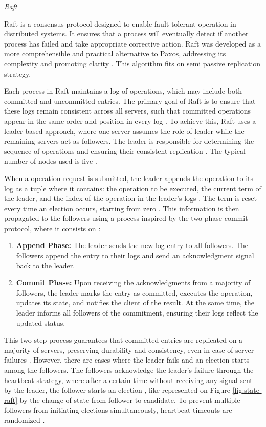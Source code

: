 \textit{\underline{Raft}}

Raft is a consensus protocol designed to enable fault-tolerant operation in distributed systems. It ensures that a process will eventually detect if another process has failed and take appropriate corrective action. Raft was developed as a more comprehensible and practical alternative to Paxos, addressing its complexity and promoting clarity \cite{raft-diego,Tanenbaum2023}. This algorithm fits on semi passive replication strategy.

Each process in Raft maintains a log of operations, which may include both committed and uncommitted entries. The primary goal of Raft is to ensure that these logs remain consistent across all servers, such that committed operations appear in the same order and position in every log \cite{Tanenbaum2023}. To achieve this, Raft uses a leader-based approach, where one server assumes the role of leader while the remaining servers act as followers. The leader is responsible for determining the sequence of operations and ensuring their consistent replication \cite{Vitillo2021}. The typical number of nodes used is five \cite{raft-diego}.

When a operation request is submitted, the leader appends the operation to its log as a tuple where it contains: the operation to be executed, the current term of the leader, and the index of the operation in the leader's logs \cite{Tanenbaum2023}. The term is reset every time an election occurs, starting from zero \cite{raft-diego}. This information is then propagated to the followers using a process inspired by the two-phase commit protocol, where it consists on \cite{Tanenbaum2023,Vitillo2021}:
\begin{enumerate}
    \item \textbf{Append Phase:} The leader sends the new log entry to all followers. The followers append the entry to their logs and send an acknowledgment signal back to the leader.
    \item \textbf{Commit Phase:} Upon receiving the acknowledgments from a majority of followers, the leader marks the entry as committed, executes the operation, updates its state, and notifies the client of the result. At the same time, the leader informs all followers of the commitment, ensuring their logs reflect the updated status.
\end{enumerate}

This two-step process guarantees that committed entries are replicated on a majority of servers, preserving durability and consistency, even in case of server failures \cite{Tanenbaum2023}. However, there are cases where the leader fails and an election starts among the followers. The followers acknowledge the leader’s failure through the heartbeat strategy, where after a certain time without receiving any signal sent by the leader, the follower starts an election \cite{Vitillo2021,raft-diego}, like represented on Figure \ref{fig:state-raft} by the change of state from follower to candidate. To prevent multiple followers from initiating elections simultaneously, heartbeat timeouts are randomized \cite{Vitillo2021, Tanenbaum2023}.


